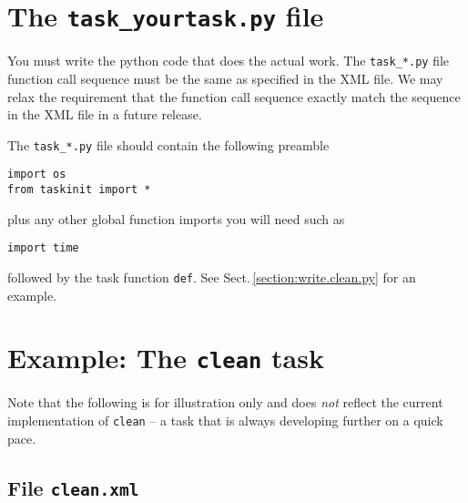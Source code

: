 
\section{The {\tt task\_yourtask.py} file}
\label{section:write.py}

You must write the python code that does the actual work. The
{\tt task\_*.py} file function call sequence must be the same as specified
in the XML file. We may relax the requirement that the function call
sequence exactly match the sequence in the XML file in a future
release.


The {\tt task\_*.py} file should contain the following preamble
\begin{verbatim}
import os
from taskinit import *
\end{verbatim} 

plus any other global function imports you will need such as

\begin{verbatim}
import time
\end{verbatim}
followed by the task function {\tt def}.  See Sect.\,\ref{section:write.clean.py}
for an example.




\section{Example: The {\tt clean} task}
\label{section:write.clean}

Note that the following is for illustration only and does {\it not} reflect
the current implementation of {\tt clean} -- a task that is always
developing further on a quick pace.


\subsection{File {\tt clean.xml} }
\label{section:write.clean.xml}

